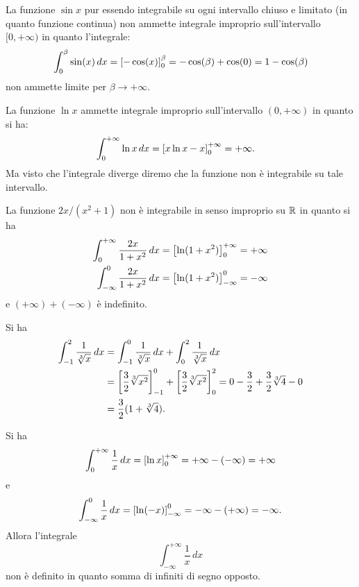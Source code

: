 \begin{example}
La funzione $\sin x$ pur essendo integrabile su ogni intervallo chiuso
e limitato (in quanto funzione continua) non ammette integrale
improprio sull'intervallo $[0,+\infty)$ in quanto l'integrale:
\[
  \int_0^\beta \sin(x)\, dx
  = {\left[ -\cos(x) \right]}_0^\beta
  = -\cos(\beta)+\cos(0) = 1-\cos(\beta)
\]
non ammette limite per $\beta\to +\infty$.
\end{example}

\begin{example}
La funzione $\ln x$ ammette integrale improprio sull'intervallo $(0,+\infty)$
in quanto si ha:
\begin{align*}
 \int_0^{+\infty}\ln x \, dx
 &= {\left[ x \ln x - x \right]}_0^{+\infty}
 = +\infty.
\end{align*}
Ma visto che l'integrale diverge diremo che la funzione non è integrabile su
tale intervallo.
\end{example}

\begin{example}
La funzione $2x/(x^2+1)$ non è integrabile in senso improprio su ${\mathbb R}$ in quanto si ha
\begin{align*}
\int_{0}^{+\infty} \frac {2x} {1+x^2}\, dx
 &= {\left[ \ln (1+x^2) \right]}_0^{+\infty} = +\infty \\
\int_{-\infty}^0 \frac{2x}{1+x^2}\, dx
 &= {\left[ \ln(1+x^2) \right]}_{-\infty}^0 = -\infty
\end{align*}
e $(+\infty)+ (-\infty)$ è indefinito.
\end{example}

\begin{example}
Si ha
\begin{align*}
  \int_{-1}^2 \frac{1}{\sqrt[3]{x}}\, dx
  &= \int_{-1}^0 \frac{1}{\sqrt[3] {x}}\, dx
   + \int_{0}^2 \frac{1}{\sqrt[3] x}\, dx \\
  &= {\left[ \frac 3 2 \sqrt[3] {x^2} \right]}_{-1}^0  + {\left[ \frac 3 2 \sqrt[3] {x^2} \right]}_0^2
  = 0 - \frac 3 2 + \frac 3 2 \sqrt[3]{4} - 0 \\
  &= \frac 3 2 (1+\sqrt[3] 4).
\end{align*}
\end{example}

\begin{example}
Si ha
\[
  \int_0^{+\infty} \frac{1}{x}\, dx
  = {\left[ \ln x \right]}_0^{+\infty}
  = +\infty - (-\infty) = +\infty
\]
e
\[
  \int_{-\infty}^{0} \frac{1}{x}\, dx
  = {\left[ \ln(-x) \right]}_{-\infty}^{0}
  = -\infty - (+\infty) = -\infty.
\]
Allora l'integrale
\[
  \int_{-\infty}^{+\infty} \frac{1}{x}\, dx
\]
non è definito in quanto somma di infiniti di segno opposto.
\end{example}

